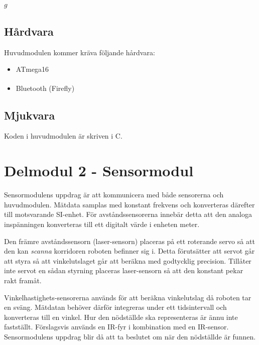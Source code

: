 \documentclass[11pt]{article}
\begin{document}
\begin{flushleft}
\begin{algorithm}[H]
\begin{algorithmic}[1]
			\Return $g$
		\EndFunction
	\end{algorithmic}
\end{algorithm}
  

\subsection{Hårdvara}
Huvudmodulen kommer kräva följande hårdvara:
\begin{itemize}
	\item ATmega16
	\item  Bluetooth\textsuperscript{\circledR}  (Firefly)
\end{itemize}


\subsection{Mjukvara}
Koden i huvudmodulen är skriven i C. 

\pagebreak
\section{Delmodul 2 - Sensormodul}
Sensormodulens uppdrag är att kommunicera med både sensorerna och huvudmodulen. Mätdata samplas med konstant frekvens och konverteras därefter till motsvarande SI-enhet. För avståndssensorerna innebär detta att den analoga inspänningen konverteras till ett digitalt värde i enheten meter.

Den främre avståndssensorn (laser-sensorn) placeras på ett roterande servo så att den kan \emph{scanna} korridoren roboten befinner sig i. Detta förutsätter att servot går att styra så att vinkelutslaget går att beräkna med godtycklig precision. Tillåter inte servot en sådan styrning placeras laser-sensorn så att den konstant pekar rakt framåt.

Vinkelhastighets-sensorerna används för att beräkna vinkelutslag då roboten tar en sväng. Mätdatan behöver därför integreras under ett tidsintervall och konverteras till en vinkel. Hur den nödställde ska representeras är ännu inte fastställt. Förslagsvis används en IR-fyr i kombination med en IR-sensor. Sensormodulens uppdrag blir då att ta beslutet om när den nödställde är funnen.


\end{flushleft}
\end{document}
